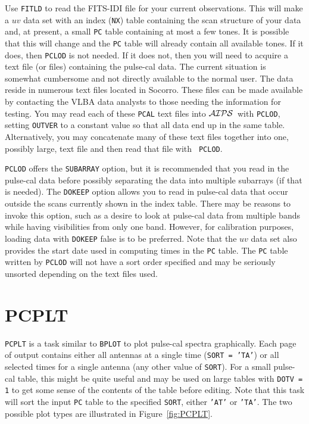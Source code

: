 \documentclass[twoside]{article}
\newcommand{\AIPS}{{$\cal AIPS\/$}}
\begin{document}
Use {\tt FITLD} to read the FITS-IDI file for your current
observations.  This will make a $uv$ data set with an index ({\tt NX})
table containing the scan structure of your data and, at present, a
small {\tt PC} table containing at most a few tones.  It is possible
that this will change and the {\tt PC} table will already contain all
available tones.  If it does, then {\tt PCLOD} is not needed.  If it
does not, then you will need to acquire a text file (or files)
containing the pulse-cal data.  The current situation is somewhat
cumbersome and not directly available to the normal user.  The data
reside in numerous text files located in Socorro.  These files can be
made available by contacting the VLBA data analysts to those needing
the information for testing.  You may read each of these {\tt PCAL}
text files into \AIPS\ with {\tt PCLOD}, setting {\tt OUTVER} to a
constant value so that all data end up in the same table.
Alternatively, you may concatenate many of these text files together
into one, possibly large, text file and then read that file with {\tt
  PCLOD}\@.

{\tt PCLOD} offers the {\tt SUBARRAY} option, but it is recommended
that you read in the pulse-cal data before possibly separating the
data into multiple subarrays (if that is needed).  The {\tt DOKEEP}
option allows you to read in pulse-cal data that occur outside the
scans currently shown in the index table.  There may be reasons to
invoke this option, such as a desire to look at pulse-cal data from
multiple bands while having visibilities from only one band.  However,
for calibration purposes, loading data with {\tt DOKEEP} false is to
be preferred.  Note that the $uv$ data set also provides the start
date used in computing times in the {\tt PC} table.  The {\tt PC}
table written by {\tt PCLOD} will not have a sort order specified and
may be seriously unsorted depending on the text files used.

\section{PCPLT}

{\tt PCPLT} is a task similar to {\tt BPLOT} to plot pulse-cal spectra
graphically.  Each page of output contains either all antennas at a
single time ({\tt SORT = 'TA'}) or all selected times for a single
antenna (any other value of {\tt SORT})\@.  For a small pulse-cal
table, this might be quite useful and may be used on large tables with
{\tt DOTV = 1} to get some sense of the contents of the table before
editing.  Note that this task will sort the input {\tt PC} table to
the specified {\tt SORT}, either {\tt 'AT'} or {\tt 'TA'}\@.  The two
possible plot types are illustrated in Figure~\ref{fig:PCPLT}.
\end{document}

